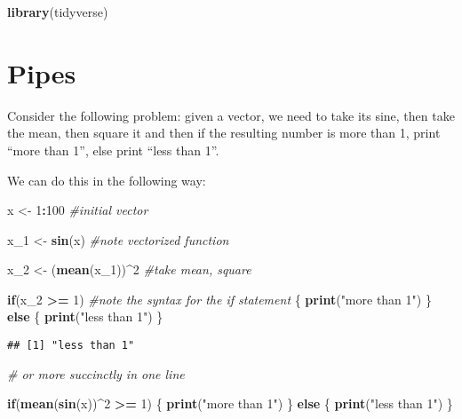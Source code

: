 \documentclass[11pt,]{article}
\newenvironment{Shaded}{\begin{snugshade}}{\end{snugshade}}
\newcommand{\KeywordTok}[1]{\textcolor[rgb]{0.13,0.29,0.53}{\textbf{#1}}}
\newcommand{\DecValTok}[1]{\textcolor[rgb]{0.00,0.00,0.81}{#1}}
\newcommand{\StringTok}[1]{\textcolor[rgb]{0.31,0.60,0.02}{#1}}
\newcommand{\CommentTok}[1]{\textcolor[rgb]{0.56,0.35,0.01}{\textit{#1}}}
\newcommand{\ControlFlowTok}[1]{\textcolor[rgb]{0.13,0.29,0.53}{\textbf{#1}}}
\newcommand{\OperatorTok}[1]{\textcolor[rgb]{0.81,0.36,0.00}{\textbf{#1}}}
\newcommand{\NormalTok}[1]{#1}
\begin{document}
\begin{Shaded}
\begin{Highlighting}[]
\KeywordTok{library}\NormalTok{(tidyverse)}
\end{Highlighting}
\end{Shaded}

\section{Pipes}\label{pipes}

Consider the following problem: given a vector, we need to take its
sine, then take the mean, then square it and then if the resulting
number is more than 1, print ``more than 1'', else print ``less than
1''.

We can do this in the following way:

\begin{Shaded}
\begin{Highlighting}[]
\NormalTok{x <-}\StringTok{ }\DecValTok{1}\OperatorTok{:}\DecValTok{100} \CommentTok{#initial vector}

\NormalTok{x_}\DecValTok{1}\NormalTok{ <-}\StringTok{ }\KeywordTok{sin}\NormalTok{(x) }\CommentTok{#note vectorized function}

\NormalTok{x_}\DecValTok{2}\NormalTok{ <-}\StringTok{ }\NormalTok{(}\KeywordTok{mean}\NormalTok{(x_}\DecValTok{1}\NormalTok{))}\OperatorTok{^}\DecValTok{2} \CommentTok{#take mean, square}

\ControlFlowTok{if}\NormalTok{(x_}\DecValTok{2} \OperatorTok{>=}\StringTok{ }\DecValTok{1}\NormalTok{) }\CommentTok{#note the syntax for the if statement}
\NormalTok{\{}
  \KeywordTok{print}\NormalTok{(}\StringTok{"more than 1"}\NormalTok{)}
\NormalTok{\} }\ControlFlowTok{else}
\NormalTok{\{}
  \KeywordTok{print}\NormalTok{(}\StringTok{"less than 1"}\NormalTok{)}
\NormalTok{\}}
\end{Highlighting}
\end{Shaded}

\begin{verbatim}
## [1] "less than 1"
\end{verbatim}

\begin{Shaded}
\begin{Highlighting}[]
\CommentTok{# or more succinctly in one line}

\ControlFlowTok{if}\NormalTok{(}\KeywordTok{mean}\NormalTok{(}\KeywordTok{sin}\NormalTok{(x))}\OperatorTok{^}\DecValTok{2} \OperatorTok{>=}\StringTok{ }\DecValTok{1}\NormalTok{)}
\NormalTok{\{}
  \KeywordTok{print}\NormalTok{(}\StringTok{"more than 1"}\NormalTok{)}
\NormalTok{\} }\ControlFlowTok{else}
\NormalTok{\{}
  \KeywordTok{print}\NormalTok{(}\StringTok{"less than 1"}\NormalTok{)}
\NormalTok{\}}
\end{Highlighting}
\end{Shaded}
\end{document}

